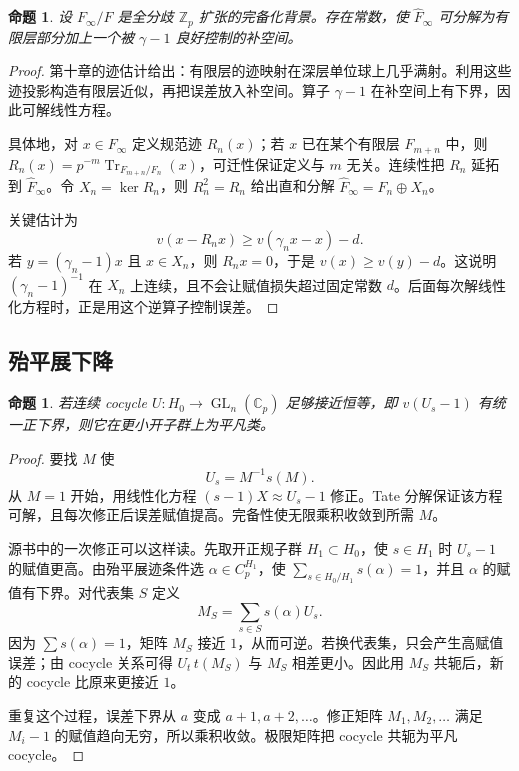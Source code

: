 \documentclass[11pt,a4paper,openany]{ctexbook}
\numberwithin{equation}{chapter}
\newcommand{\C}{\mathbb{C}}
\newcommand{\Z}{\mathbb{Z}}
\newcommand{\GL}{\operatorname{GL}}
\theoremstyle{plain}
\newtheorem{proposition}[theorem]{命题}
\theoremstyle{definition}
\theoremstyle{remark}
\begin{document}
\begin{proposition}
设 $F_\infty/F$ 是全分歧 $\Z_p$ 扩张的完备化背景。存在常数，使 $\widehat F_\infty$ 可分解为有限层部分加上一个被 $\gamma-1$ 良好控制的补空间。
\end{proposition}

\begin{proof}
第十章的迹估计给出：有限层的迹映射在深层单位球上几乎满射。利用这些迹投影构造有限层近似，再把误差放入补空间。算子 $\gamma-1$ 在补空间上有下界，因此可解线性方程。

具体地，对 $x\in F_\infty$ 定义规范迹 $R_n(x)$；若 $x$ 已在某个有限层 $F_{m+n}$ 中，则 $R_n(x)=p^{-m}\operatorname{Tr}_{F_{m+n}/F_n}(x)$，可迁性保证定义与 $m$ 无关。连续性把 $R_n$ 延拓到 $\widehat F_\infty$。令 $X_n=\ker R_n$，则 $R_n^2=R_n$ 给出直和分解 $\widehat F_\infty=F_n\oplus X_n$。

关键估计为
\[
  v(x-R_nx)\ge v(\gamma_n x-x)-d.
\]
若 $y=(\gamma_n-1)x$ 且 $x\in X_n$，则 $R_nx=0$，于是 $v(x)\ge v(y)-d$。这说明 $(\gamma_n-1)^{-1}$ 在 $X_n$ 上连续，且不会让赋值损失超过固定常数 $d$。后面每次解线性化方程时，正是用这个逆算子控制误差。
\end{proof}

\subsection{殆平展下降}

\begin{proposition}
若连续 cocycle $U:H_0\to\GL_n(\C_p)$ 足够接近恒等，即 $v(U_s-1)$ 有统一正下界，则它在更小开子群上为平凡类。
\end{proposition}

\begin{proof}
要找 $M$ 使
\[
  U_s=M^{-1}s(M).
\]
从 $M=1$ 开始，用线性化方程 $(s-1)X\approx U_s-1$ 修正。Tate 分解保证该方程可解，且每次修正后误差赋值提高。完备性使无限乘积收敛到所需 $M$。

源书中的一次修正可以这样读。先取开正规子群 $H_1\subset H_0$，使 $s\in H_1$ 时 $U_s-1$ 的赋值更高。由殆平展迹条件选 $\alpha\in C_p^{H_1}$，使 $\sum_{s\in H_0/H_1}s(\alpha)=1$，并且 $\alpha$ 的赋值有下界。对代表集 $S$ 定义
\[
  M_S=\sum_{s\in S}s(\alpha)U_s.
\]
因为 $\sum s(\alpha)=1$，矩阵 $M_S$ 接近 $1$，从而可逆。若换代表集，只会产生高赋值误差；由 cocycle 关系可得 $U_t\,t(M_S)$ 与 $M_S$ 相差更小。因此用 $M_S$ 共轭后，新的 cocycle 比原来更接近 $1$。

重复这个过程，误差下界从 $a$ 变成 $a+1,a+2,\ldots$。修正矩阵 $M_1,M_2,\ldots$ 满足 $M_i-1$ 的赋值趋向无穷，所以乘积收敛。极限矩阵把 cocycle 共轭为平凡 cocycle。
\end{proof}
\end{document}

